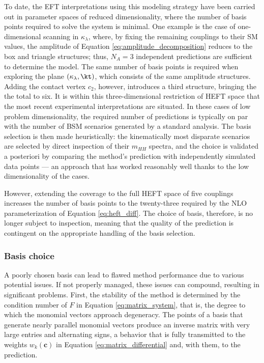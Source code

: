 To date, the EFT interpretations using this modeling strategy have been carried out in parameter spaces of reduced dimensionality, where the number of basis points required to solve the system is minimal. One example is the case of one-dimensional scanning in $\kappa_{\lambda}$, where, by fixing the remaining couplings to their SM values, the amplitude of Equation \ref{eq:amplitude_decomposition} reduces to the box and triangle structures; thus, $N_A=3$ independent predictions are sufficient to determine the model. The same number of basis points is required when exploring the plane $(\kappa_{\lambda},\kt)$, which consists of the same amplitude structures. Adding the contact vertex $c_2$, however, introduces a third structure, bringing the the total to six. It is within this three-dimensional restriction of HEFT space that the most recent experimental interpretations are situated. In these cases of low problem dimensionality, the required number of predictions is typically on par with the number of BSM scenarios generated by a standard analysis. The basis selection is then made heuristically: the kinematically most disparate scenarios are selected by direct inspection of their $m_{HH}$ spectra, and the choice is validated a posteriori by comparing the method’s prediction with independently simulated data points — an approach that has worked reasonably well thanks to the low dimensionality of the cases.

However, extending the coverage to the full HEFT space of five couplings increases the number of basis points to the twenty-three required by the NLO parameterization of Equation \ref{eq:heft_diff}. The choice of basis, therefore, is no longer subject to inspection, meaning that the quality of the prediction is contingent on the appropriate handling of the basis selection.


\subsubsection{Basis choice}

A poorly chosen basis can lead to flawed method performance due to various potential issues. If not properly managed, these issues can compound, resulting in significant problems. First, the stability of the method is determined by the condition number of $F$ in Equation \ref{eq:matrix_system}, that is, the degree to which the monomial vectors approach degeneracy.  The points of a basis that generate nearly parallel monomial vectors produce an inverse matrix with very large entries and alternating signs, a behavior that is fully transmitted to the weights $w_k(\mathbf{c})$ in Equation \ref{eq:matrix_differential} and, with them, to the prediction.

